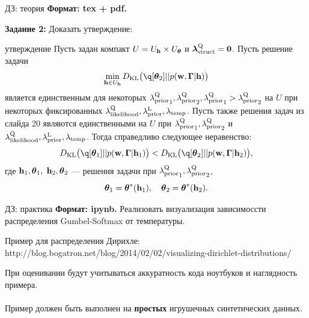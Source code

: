 \documentclass[10pt,pdf,utf8,russian,aspectratio=169]{beamer}
\begin{document}
\begin{frame}{ДЗ: теория}
\textbf{Формат: tex + pdf.}

\textbf{Задание 2:}
Доказать утверждение:
\begin{block}{утверждение}
Пусть задан компакт $U = U_{\mathbf{h}} \times U_{\boldsymbol{\theta}}$ и  $\boldsymbol{\lambda}_\text{struct}^\text{Q}=\mathbf{0}$. Пусть решение задачи
\[
\min_{\h \in \Uh} \KL{\q[\teta_2]}{p(\w, \Gam|\h)}
\]
 является единственным для некоторых ${\lambda_\text{prior}^\text{Q}}_1, {\lambda_\text{prior}^\text{Q}}_2, {\lambda_\text{prior}^\text{Q}}_1 > {\lambda_\text{prior}^\text{Q}}_2$ на $U$ при некоторых фиксированных $\lambda_\text{likelihood}^\text{Q}, \lambda_\text{prior}^\text{L}, \lambda_{\text{temp}}$.
Пусть также решения задач из слайда 20 являются единственными на $U$ при ${\lambda_\text{prior}^\text{Q}}_1, {\lambda_\text{prior}^\text{Q}}_2$ и $\lambda_\text{likelihood}^\text{Q}, \lambda_\text{prior}^\text{L}, \lambda_{\text{temp}}$.
Тогда справедливо следующее неравенство:
\[
    \KL{\q[\teta_1]}{p(\w, \Gam|\h_1)}  <   \KL{\q[\teta_2]}{p(\w, \Gam|\h_2)},
\]
где $\mathbf{h}_1, \boldsymbol{\theta}_1,$ $\mathbf{h}_2, \boldsymbol{\theta}_2$  --- решения задачи  при ${\lambda_\text{prior}^\text{Q}}_1, {\lambda_\text{prior}^\text{Q}}_2$,
$$
\boldsymbol{\theta}_1 = \boldsymbol{\theta}^{*}(\mathbf{h}_1), \quad  \boldsymbol{\theta}_2 = \boldsymbol{\theta}^{*}(\mathbf{h}_2).$$

\end{block}


\end{frame}

\begin{frame}{ДЗ: практика}
\textbf{Формат: ipynb.}
Реализовать визуализация зависимоссти распределения Gumbel-Softmax от температуры.

Пример для распределения Дирихле:
http://blog.bogatron.net/blog/2014/02/02/visualizing-dirichlet-distributions/

При оценивании будут учитываться аккуратность кода ноутбуков и наглядность примера.\\~\\
Пример должен быть выполнен на  \textbf{простых} игрушечных синтетических данных.
\end{frame}
\end{document}
